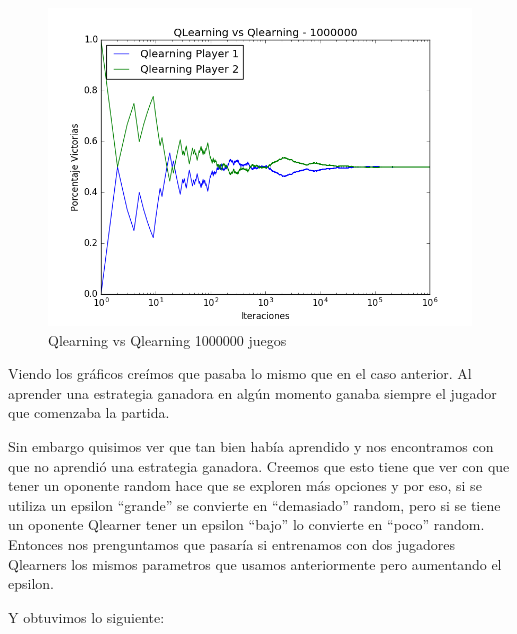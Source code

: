 \begin{figure}[h]
 \centering
 \begin{minipage}{.45\textwidth}
	\centering
	\includegraphics[scale=0.35]{img1/QlearningVsQlearning_1000000_6x5_merge.png}
        \caption{Qlearning vs Qlearning 1000000 juegos}
  \end{minipage}
\end{figure}

Viendo los gráficos creímos que pasaba lo mismo que en el caso anterior. Al aprender una estrategia ganadora en algún momento ganaba siempre el jugador que comenzaba la partida. 

Sin embargo quisimos ver que tan bien había aprendido y nos encontramos con que no aprendió una estrategia ganadora. Creemos que esto tiene que ver con que tener un oponente random hace que se exploren más opciones y por eso, si se utiliza un epsilon ``grande'' se convierte en ``demasiado'' random, pero si se tiene un oponente Qlearner tener un epsilon ``bajo'' lo convierte en ``poco'' random. \\

Entonces nos prenguntamos que pasaría si entrenamos con dos jugadores Qlearners los mismos parametros que usamos anteriormente pero aumentando el epsilon. 

Y obtuvimos lo siguiente:

